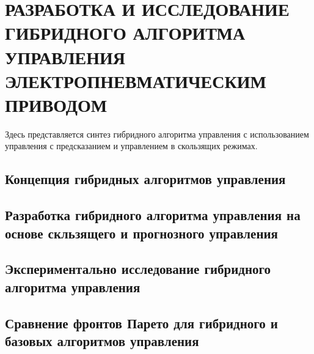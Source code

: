 \chapter{РАЗРАБОТКА И ИССЛЕДОВАНИЕ ГИБРИДНОГО АЛГОРИТМА УПРАВЛЕНИЯ ЭЛЕКТРОПНЕВМАТИЧЕСКИМ ПРИВОДОМ}\label{ch:ch7}

Здесь представляется синтез гибридного алгоритма управления с использованием
управления с предсказанием и управлением в скользящих режимах.

\section{Концепция гибридных алгоритмов управления}\label{sec:ch7/sec1}

\section{Разработка гибридного алгоритма управления на основе скльзящего и прогнозного управления}\label{sec:ch7/sec2}

\section{Экспериментально исследование гибридного алгоритма управления}\label{sec:ch7/sec3}

\section{Сравнение фронтов Парето для гибридного и базовых алгоритмов управления}\label{sec:ch7/sec4}
